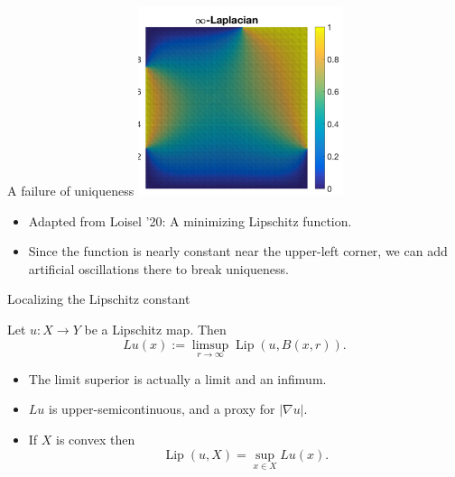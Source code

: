 \documentclass[10pt]{beamer}
\DeclareMathOperator{\Lip}{Lip}
\begin{document}
\begin{frame}{A failure of uniqueness}
    \centering 
    \includegraphics[width=6cm]{KirszbraunValentine.png}
    
\begin{itemize}
\item Adapted from Loisel '20: A minimizing Lipschitz function.
\item Since the function is nearly constant near the upper-left corner, we can add artificial oscillations there to break uniqueness.
\end{itemize}
\end{frame}

\begin{frame}{Localizing the Lipschitz constant}
\begin{definition}
Let $u: X \to Y$ be a Lipschitz map. Then
$$Lu(x) := \limsup_{r \to \infty} \Lip(u, B(x, r)).$$
\end{definition}

\begin{itemize}
\item The limit superior is actually a limit and an infimum. \pause
\item $Lu$ is upper-semicontinuous, and a proxy for $|\nabla u|$. \pause
\item If $X$ is convex then 
$$\Lip(u, X) = \sup_{x \in X} Lu(x).$$
\end{itemize}
\end{frame}
\end{document}
